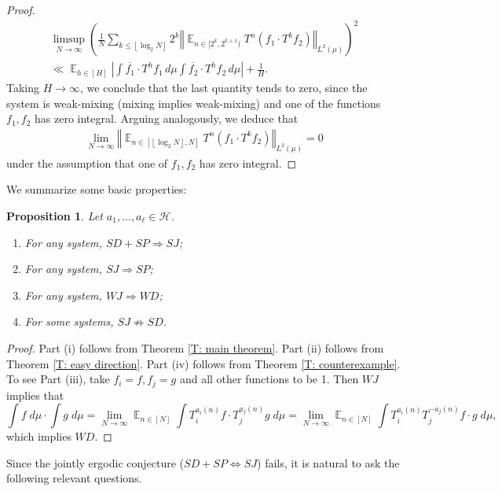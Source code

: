\documentclass[11pt]{amsart}
\newtheorem{proposition}[lemma]{Proposition}
\theoremstyle{definition}
\DeclareMathOperator*{\E}{\mathbb{E}}
\newcommand{\norm}[1]{\left\Vert #1\right\Vert}
\newcommand{\1}{{\mathbf{1}}}
\newcommand{\brac}[1]{\mathopen{}\left( #1 \mathclose{}\right)}
\newcommand{\floor}[1]{{\left \lfloor #1 \right \rfloor}}
\begin{document}
\begin{proof}
\begin{multline*}
    \limsup_{N\to\infty}\brac{\frac{1}{N}\sum_{k\leq \floor{\log_2 N}}2^k \norm{\E_{n\in[2^k,2^{k+1})} T^n(f_1\cdot T^{k}f_2)}_{L^2(\mu)}}^2\\
    \ll     \E_{h\in[H]}\left|\int \overline{f_1}\cdot T^h f_1\, d\mu \int \overline{f_2}\cdot T^h f_2\, d\mu\right|+\frac{1}{H}.
    \end{multline*}
    Taking $H\to\infty$, we conclude that the last quantity tends to zero, since the system is weak-mixing (mixing implies weak-mixing) and one of the functions $f_1,f_2$ has zero integral. Arguing analogously, we deduce that
    \begin{align*}
        \lim_{N\to\infty}\norm{\E_{n\in[\floor{\log_2 N}, N]}T^n(f_1\cdot T^{k}f_2)}_{L^2(\mu)} = 0
    \end{align*}
    under the assumption that one of $f_1,f_2$ has zero integral.
\end{proof}


\fi



We summarize some basic properties:

\begin{proposition}\label{all}
Let $a_{1},\dots,a_{\ell}\in\mathcal{H}$.
    \begin{enumerate}
    \item For any system, $SD+SP\Rightarrow SJ$;
    \item For any system,  $SJ\Rightarrow SP$;
    \item For any system,  $WJ\Rightarrow WD$;
    \item For some systems,  $SJ\not\Rightarrow SD$.
    \end{enumerate}
\end{proposition}
\begin{proof}
Part (i) follows from Theorem \ref{T: main theorem}. Part (ii) follows from Theorem \ref{T: easy direction}. Part (iv) follows from Theorem \ref{T: counterexample}. To see Part (iii), take $f_{i}=f, f_{j}=g$ and all other functions to be 1. Then $WJ$ implies that 
    $$\int f\; d\mu\cdot\int g\; d\mu=\lim_{N\to\infty}\E_{n\in[N]}\int T_{i}^{a_{i}(n)}f\cdot T_{j}^{a_{j}(n)}g\; d\mu=\lim_{N\to\infty}\E_{n\in[N]}\int T_{i}^{a_{i}(n)}T_{j}^{-a_{j}(n)}f\cdot g\; d\mu,$$
    which implies $WD$.
\end{proof}

Since the jointly ergodic conjecture ($SD+SP\Longleftrightarrow SJ$) fails, it is natural to ask the following relevant questions.
\end{document}
